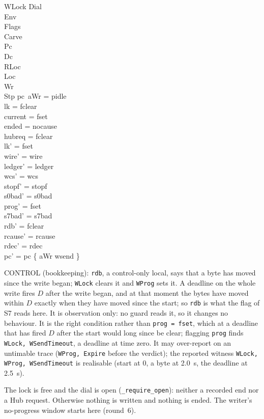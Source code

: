 \documentclass[a4paper,10pt,fleqn]{article}
\begin{document}
\begin{schema}{WLock}
  \Xi Dial \\ \Xi Env \\ \Xi Flags \\ \Xi Carve \\ \Delta Pc \\ \Xi Dc \\
  \Delta RLoc \\ \Xi Loc \\ \Delta Wr \\ \Delta Stp
\where
  pc~aWr = pidle \\
  lk = fclear \\
  current = fset \\
  ended = nocause \\
  hubreq = fclear \\
  lk' = fset \\
  wire' = wire \\
  ledger' = ledger \\
  wcs' = wcs \\
  stopf' = stopf \\
  s0bad' = s0bad \\
  prog' = fset \\
  s7bad' = s7bad \\
  rdb' = fclear \\
  rcause' = rcause \\
  rdec' = rdec \\
  pc' = pc \oplus \{ aWr \mapsto wsend \}
\end{schema}

CONTROL (bookkeeping): \texttt{rdb}, a control-only local, says that a byte has
moved since the write began; \texttt{WLock} clears it and \texttt{WProg} sets
it.  A deadline on the whole write fires $D$ after the write began, and at that
moment the bytes have moved within $D$ exactly when they have moved since the
start; so \texttt{rdb} is what the flag of S7 reads here.  It is observation
only: no guard reads it, so it changes no behaviour.  It is the right condition
rather than \texttt{prog = fset}, which at a deadline that has fired $D$ after
the start would long since be clear; flagging \texttt{prog} finds
\texttt{WLock, WSendTimeout}, a deadline at time zero.  It may over-report on an
untimable trace (\texttt{WProg, Expire} before the verdict); the reported
witness \texttt{WLock, WProg, WSendTimeout} is realisable (start at 0, a byte at
2.0~s, the deadline at 2.5~s).

The lock is free and the dial is open (\texttt{\_require\_open}): neither a
recorded end nor a Hub request.  Otherwise nothing is written and nothing is
ended.  The writer's no-progress window starts here (round~6).
\end{document}

